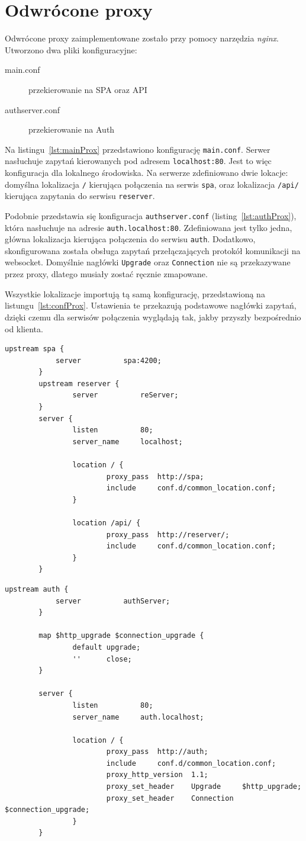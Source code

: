 \section{Odwrócone proxy}
	Odwrócone proxy zaimplementowane zostało przy pomocy narzędzia \emph{nginx}.
	Utworzono dwa pliki konfiguracyjne:
	\begin{description}
		\item[main.conf] przekierowanie na SPA oraz API
		\item[authserver.conf] przekierowanie na Auth
	\end{description}

	Na listingu~\ref{lst:mainProx} przedstawiono konfigurację \verb|main.conf|.
	Serwer nasłuchuje zapytań kierowanych pod adresem \verb|localhost:80|.
	Jest to więc konfiguracja dla lokalnego środowiska.
	Na serwerze zdefiniowano dwie lokacje:
	domyślna lokalizacja \verb|/| kierująca połączenia na serwis \verb|spa|,
	oraz lokalizacja \verb|/api/| kierująca zapytania do serwisu \verb|reserver|.
	
	Podobnie przedstawia się konfiguracja \verb|authserver.conf| (listing~\ref{lst:authProx}), która nasłuchuje na adresie \verb|auth.localhost:80|.
	Zdefiniowana jest tylko jedna, główna lokalizacja kierująca połączenia do serwisu \verb|auth|.
	Dodatkowo, skonfigurowana została obsługa zapytań przełączających protokół komunikacji na websocket.
	Domyślnie nagłówki \verb|Upgrade| oraz \verb|Connection| nie są przekazywane przez proxy, dlatego musiały zostać ręcznie zmapowane.

	Wszystkie lokalizacje importują tą samą konfigurację, przedstawioną na listungu~\ref{lst:confProx}.
	Ustawienia te przekazują podstawowe nagłówki zapytań, dzięki czemu dla serwisów połączenia wyglądają tak, jakby przyszły bezpośrednio od klienta.
	\begin{lstlisting}[label=lst:mainProx, caption=Ustawienia proxy SPA i API, float=h]
		upstream spa {
			server          spa:4200;
		}
		upstream reserver {
				server          reServer;
		}
		server {
				listen          80;
				server_name     localhost;
		
				location / {
						proxy_pass  http://spa;
						include     conf.d/common_location.conf;
				}
		
				location /api/ {
						proxy_pass  http://reserver/;
						include     conf.d/common_location.conf;
				}
		}
	\end{lstlisting}

	\begin{lstlisting}[label=lst:authProx, caption=Ustawienia proxy Auth, float=h]
		upstream auth {
			server          authServer;
		}

		map $http_upgrade $connection_upgrade {
				default upgrade;
				''      close;
		}

		server {
				listen          80;
				server_name     auth.localhost;
		
				location / {
						proxy_pass  http://auth;
						include     conf.d/common_location.conf;
						proxy_http_version  1.1;
						proxy_set_header    Upgrade     $http_upgrade;
						proxy_set_header    Connection  $connection_upgrade;
				}
		}
	\end{lstlisting}

